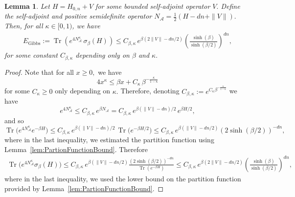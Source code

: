 \documentclass[11pt]{amsart}
\newcommand{\1}{\mathbbm{1}}
\newcommand{\Tr}{\operatorname{Tr}}
\newcommand{\NA}{N_{\mathcal{A}}}
\theoremstyle{plain}
\newtheorem{lemma}[theorem]{Lemma}
\theoremstyle{definition}
\theoremstyle{remark}
\numberwithin{equation}{section}
\begin{document}
\begin{lemma}
\label{lem:EGibbsBoundedperturbation}
Let $H= H_{0,n} + V$ for some bounded self-adjoint operator $V.$ Define the self-adjoint and positive semidefinite operator $\NA = \frac{1}{2}\left(H -dn+ \|V\|\right).$
Then, for all $\kappa\in[0,1)$, we have 
\begin{align}
E_{\operatorname{Gibbs}} := \Tr\left(e^{4\NA^\kappa} \,\sigma_\beta(H)\right) \le C_{\beta,\kappa} \,e^{\beta(2\|V\|-dn/2)}  \left(\frac{\sinh(\beta)}{\sinh(\beta/2)}\right)^{dn},
\end{align}
for some constant $C_{\beta,\kappa}$ depending only on $\beta$ and $\kappa.$
\end{lemma}
\begin{proof}
Note that for all $x\ge 0,$ we have
\[
4x^\kappa \le \beta x + C_\kappa\, \beta^{-\frac{\kappa}{1-\kappa}}
\]
for some $C_\kappa\ge0$ only depending on $\kappa.$ Therefore, denoting $C_{\beta,\kappa} := e^{C_\kappa \beta^{-\frac{\kappa}{1-\kappa}}}$
we have $$
e^{4\NA^\kappa}
\le
C_{\beta,\kappa}\,e^{\beta\NA}=C_{\beta,\kappa}\,e^{\beta(\|V\|-dn)/2}\,e^{\beta H/2},
$$
and so
\[
\Tr\!\bigl(e^{4\NA^\kappa}e^{-\beta H}\bigr)
\le
C_{\beta,\kappa}\,e^{\beta (\|V\|-dn)/2}\,
\Tr\bigl(e^{-\beta H/2}\bigr) \le C_{\beta,\kappa} \,e^{\beta (\|V\|-dn/2)}\left(2\sinh(\beta/2)\right)^{-dn},
 \]
where in the last inequality, we estimated the partition function using Lemma~\ref{lem:PartionFunctionBound}.
Therefore
\begin{align*}
\label{eq:E_GibbsProofSF}
\Tr\bigl(e^{4\NA^\kappa}\sigma_\beta(H)\bigr)
\le
C_{\beta,\kappa} \,e^{\beta(\|V\|-dn/2)} \frac{\left(2\sinh(\beta/2)\right)^{-dn}}{\Tr\left(e^{-\beta H}\right)} \le C_{\beta,\kappa} \,e^{\beta(2\|V\|-dn/2)}  \left(\frac{\sinh(\beta)}{\sinh(\beta/2)}\right)^{dn},
\end{align*}
where in the last inequality, we used the lower bound on the partition function provided by Lemma~\ref{lem:PartionFunctionBound}.
\end{proof}
\end{document}
